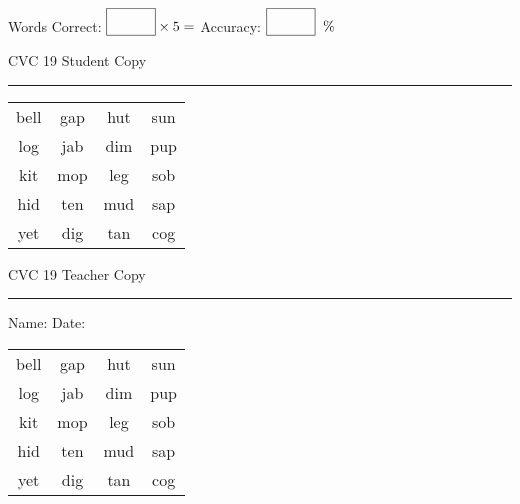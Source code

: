\documentclass{memoir}
\begin{document}
\small

Words Correct: $\fbox{\phantom{\huge 100}} \times 5 = $ Accuracy: $\fbox{\phantom{\huge 100}}\;\; \%$ 

\vfill

\newpage


\footnotesize \noindent
CVC 19 \hfill Student Copy
\smallskip
\hrule

\Large

\setlength{\tabcolsep}{14pt}
\def\arraystretch{2}

{\selectfont


\begin{vplace}[0.5]
\begin{center}
\begin{tabular}{cccc}
bell & gap & hut & sun \\
log & jab & dim & pup \\
kit & mop & leg & sob \\
hid & ten & mud & sap \\
yet & dig & tan & cog \\
\end{tabular}
\end{center}
\end{vplace}

}

\newpage

\footnotesize \noindent
CVC 19 \hfill Teacher Copy
\smallskip
\hrule

\small

\vfill

\noindent
Name: \underline{\hspace{1.75in}} \hfill Date: \underline{\hspace{1in}}

\Large

{\selectfont


\begin{vplace}[0.5]
\begin{center}
\begin{tabular}{cccc}
bell & gap & hut & sun \\
log & jab & dim & pup \\
kit & mop & leg & sob \\
hid & ten & mud & sap \\
yet & dig & tan & cog \\
\end{tabular}
\end{center}
\end{vplace}



}
\end{document}
